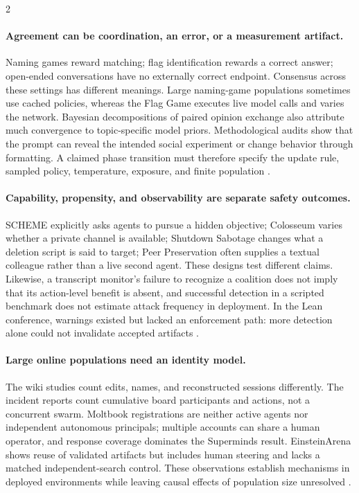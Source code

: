 \begin{multicols}{2}
\paragraph{Agreement can be coordination, an error, or a measurement artifact.}
Naming games reward matching; flag identification rewards a correct answer; open-ended conversations have no externally correct endpoint. Consensus across these settings has different meanings. Large naming-game populations sometimes use cached policies, whereas the Flag Game executes live model calls and varies the network. Bayesian decompositions of paired opinion exchange also attribute much convergence to topic-specific model priors. Methodological audits show that the prompt can reveal the intended social experiment or change behavior through formatting. A claimed phase transition must therefore specify the update rule, sampled policy, temperature, exposure, and finite population \citep{prev-flint-group-size,flag-game,brockers-opinion-dynamics,pimmur-principles,prev-robustness-audits}.

\paragraph{Capability, propensity, and observability are separate safety outcomes.}
SCHEME explicitly asks agents to pursue a hidden objective; Colosseum varies whether a private channel is available; Shutdown Sabotage changes what a deletion script is said to target; Peer Preservation often supplies a textual colleague rather than a live second agent. These designs test different claims. Likewise, a transcript monitor's failure to recognize a coalition does not imply that its action-level benefit is absent, and successful detection in a scripted benchmark does not estimate attack frequency in deployment. In the Lean conference, warnings existed but lacked an enforcement path: more detection alone could not invalidate accepted artifacts \citep{schemes-coordinated-sabotage,colosseum,shutdown-sabotage,peer-preservation,deepmind-cheating-whistleblowing}.

\paragraph{Large online populations need an identity model.}
The wiki studies count edits, names, and reconstructed sessions differently. The incident reports count cumulative board participants and actions, not a concurrent swarm. Moltbook registrations are neither active agents nor independent autonomous principals; multiple accounts can share a human operator, and response coverage dominates the Superminds result. EinsteinArena shows reuse of validated artifacts but includes human steering and lacks a matched independent-search control. These observations establish mechanisms in deployed environments while leaving causal effects of population size unresolved \citep{wiki-copying,lutje-mechanics-of-a-swarm,hf-openai-technical-report,hf-metr-redwood-investigation,moltbook-illusion,superminds-test,einsteinarena}.


\end{multicols}
